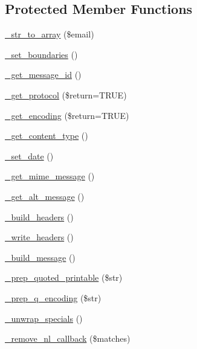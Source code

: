 \subsection*{Protected Member Functions}
\begin{DoxyCompactItemize}
\item 
\hyperlink{class_c_i___email_a64cd83e470ede0781d028d7198474d1c}{\+\_\+str\+\_\+to\+\_\+array} (\$email)
\item 
\hyperlink{class_c_i___email_a833159a24d7ecf81ad6622152bae1b52}{\+\_\+set\+\_\+boundaries} ()
\item 
\hyperlink{class_c_i___email_a253c34263736465755f85ec4192aa6b4}{\+\_\+get\+\_\+message\+\_\+id} ()
\item 
\hyperlink{class_c_i___email_a646c3efc3a23d9cc5e86ffeaf6983a51}{\+\_\+get\+\_\+protocol} (\$return=T\+R\+U\+E)
\item 
\hyperlink{class_c_i___email_aeade488121ff70d54f47173ea85e17f8}{\+\_\+get\+\_\+encoding} (\$return=T\+R\+U\+E)
\item 
\hyperlink{class_c_i___email_a0df0801e489187b9f8108ec776f98f2e}{\+\_\+get\+\_\+content\+\_\+type} ()
\item 
\hyperlink{class_c_i___email_a0c25effa0066e09273d092572709f6eb}{\+\_\+set\+\_\+date} ()
\item 
\hyperlink{class_c_i___email_a2211ba669bd8d076041d4e72bc8a9c59}{\+\_\+get\+\_\+mime\+\_\+message} ()
\item 
\hyperlink{class_c_i___email_a1a87461e94ab7466b7b6f22682c4a055}{\+\_\+get\+\_\+alt\+\_\+message} ()
\item 
\hyperlink{class_c_i___email_a5dbec091c7efce89395a40e460b75d49}{\+\_\+build\+\_\+headers} ()
\item 
\hyperlink{class_c_i___email_a6bde7269215bc1093811ae098bb034bf}{\+\_\+write\+\_\+headers} ()
\item 
\hyperlink{class_c_i___email_a9ddc60e529eb909ff0879781a6f296ff}{\+\_\+build\+\_\+message} ()
\item 
\hyperlink{class_c_i___email_af2beda05a0ab5d0ec65b03da633b1d33}{\+\_\+prep\+\_\+quoted\+\_\+printable} (\$str)
\item 
\hyperlink{class_c_i___email_a56a4d842c3dfe77bcb41082a82c5df24}{\+\_\+prep\+\_\+q\+\_\+encoding} (\$str)
\item 
\hyperlink{class_c_i___email_af50bcab235f0eff47d7117d77733f1d9}{\+\_\+unwrap\+\_\+specials} ()
\item 
\hyperlink{class_c_i___email_a3a624f07cca99fe6ab1b61dbec56eef8}{\+\_\+remove\+\_\+nl\+\_\+callback} (\$matches)

\end{DoxyCompactItemize}

